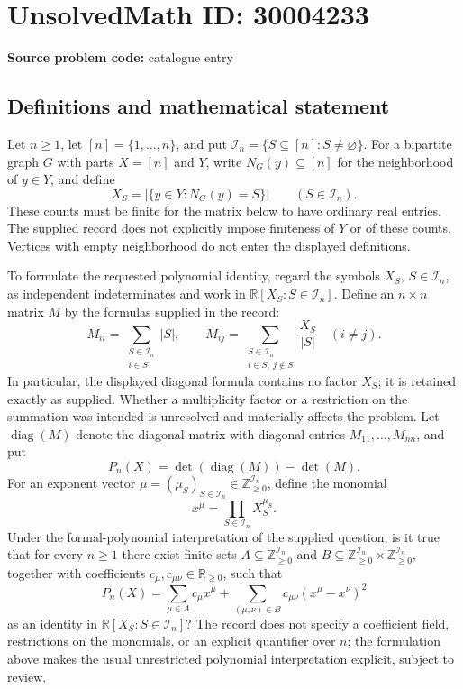 \documentclass[11pt]{article}
\newcommand{\Z}{\mathbb{Z}}
\newcommand{\R}{\mathbb{R}}
\begin{document}
\section*{UnsolvedMath ID: 30004233}
\textbf{Source problem code:} catalogue entry
\subsection{Definitions and mathematical statement}
Let \(n\geq 1\), let \([n]=\{1,\ldots,n\}\), and put \(\mathcal I_n=\{S\subseteq[n]:S\neq\varnothing\}\). For a bipartite graph \(G\) with parts \(X=[n]\) and \(Y\), write \(N_G(y)\subseteq[n]\) for the neighborhood of \(y\in Y\), and define
\[
X_S=\bigl|\{y\in Y:N_G(y)=S\}\bigr|\qquad(S\in\mathcal I_n).
\]
These counts must be finite for the matrix below to have ordinary real entries. The supplied record does not explicitly impose finiteness of \(Y\) or of these counts. Vertices with empty neighborhood do not enter the displayed definitions.

To formulate the requested polynomial identity, regard the symbols \(X_S\), \(S\in\mathcal I_n\), as independent indeterminates and work in \(\R[X_S:S\in\mathcal I_n]\). Define an \(n\times n\) matrix \(M\) by the formulas supplied in the record:
\[
M_{ii}=\sum_{\substack{S\in\mathcal I_n\\i\in S}}|S|,
\qquad
M_{ij}=\sum_{\substack{S\in\mathcal I_n\\i\in S,\ j\notin S}}\frac{X_S}{|S|}\quad(i\neq j).
\]
In particular, the displayed diagonal formula contains no factor \(X_S\); it is retained exactly as supplied. Whether a multiplicity factor or a restriction on the summation was intended is unresolved and materially affects the problem. Let \(\operatorname{diag}(M)\) denote the diagonal matrix with diagonal entries \(M_{11},\ldots,M_{nn}\), and put
\[
P_n(X)=\det(\operatorname{diag}(M))-\det(M).
\]
For an exponent vector \(\mu=(\mu_S)_{S\in\mathcal I_n}\in\Z_{\geq0}^{\mathcal I_n}\), define the monomial
\[
x^\mu=\prod_{S\in\mathcal I_n}X_S^{\mu_S}.
\]
Under the formal-polynomial interpretation of the supplied question, is it true that for every \(n\geq1\) there exist finite sets \(A\subseteq\Z_{\geq0}^{\mathcal I_n}\) and \(B\subseteq\Z_{\geq0}^{\mathcal I_n}\times\Z_{\geq0}^{\mathcal I_n}\), together with coefficients \(c_\mu,c_{\mu\nu}\in\R_{\geq0}\), such that
\[
P_n(X)=\sum_{\mu\in A}c_\mu x^\mu+
\sum_{(\mu,\nu)\in B}c_{\mu\nu}(x^\mu-x^\nu)^2
\]
as an identity in \(\R[X_S:S\in\mathcal I_n]\)? The record does not specify a coefficient field, restrictions on the monomials, or an explicit quantifier over \(n\); the formulation above makes the usual unrestricted polynomial interpretation explicit, subject to review.
\end{document}
